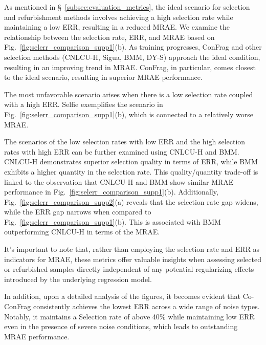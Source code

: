 \documentclass{article}
\theoremstyle{plain}
\theoremstyle{definition}
\theoremstyle{remark}
\begin{document}
As mentioned in \S~\ref{subsec:evaluation_metrics}, the ideal scenario for selection and refurbishment methods involves achieving a high selection rate while maintaining a low ERR, 
resulting in a reduced MRAE. We examine the relationship between the selection rate, ERR, and MRAE based on Fig.~\ref{fig:selerr_comparison_supp1}(b). 
As training progresses, ConFrag and other selection methods (CNLCU-H, Sigua, BMM, DY-S) approach the ideal condition, resulting in an improving trend in MRAE. 
ConFrag, in particular, comes closest to the ideal scenario, resulting in superior MRAE performance.

The most unfavorable scenario arises when there is a low selection rate coupled with a high ERR. 
Selfie exemplifies the scenario in Fig.~\ref{fig:selerr_comparison_supp1}(b), which is connected to a relatively worse MRAE.

The scenarios of the low selection rates with low ERR and the high selection rates with high ERR can be further examined using CNLCU-H and BMM. 
CNLCU-H demonstrates superior selection quality in terms of ERR, while BMM exhibits a higher quantity in the selection rate. 
This quality/quantity trade-off is linked to the observation that CNLCU-H and BMM show similar MRAE performance in Fig.~\ref{fig:selerr_comparison_supp1}(b). 
Additionally, Fig.~\ref{fig:selerr_comparison_supp2}(a) reveals that the selection rate gap widens, while the ERR gap narrows when compared to Fig.~\ref{fig:selerr_comparison_supp1}(b). 
This is associated with BMM outperforming CNLCU-H in terms of the MRAE.

It's important to note that, rather than employing the selection rate and ERR as indicators for MRAE, 
these metrics offer valuable insights when assessing selected or refurbished samples 
directly independent of any potential regularizing effects introduced by the underlying regression model.

In addition, upon a detailed analysis of the figures, it becomes evident that Co-ConFrag consistently achieves the lowest ERR across a wide range of noise types. 
Notably, it maintains a Selection rate of above 40\% while maintaining low ERR even in the presence of severe noise conditions, which leads to outstanding MRAE performance.

\end{document}

